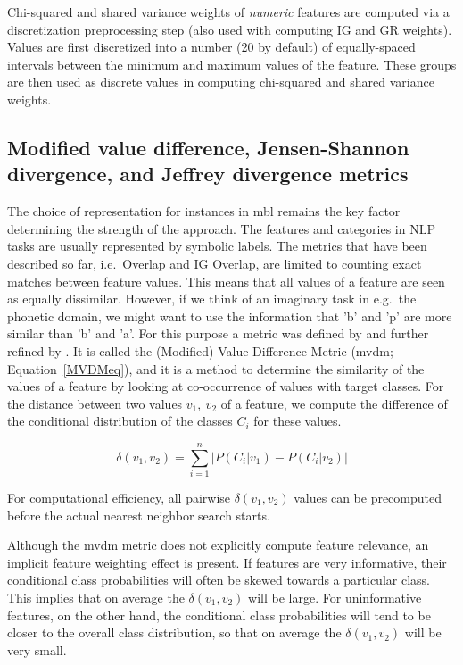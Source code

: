 \documentclass{book}
\begin{document}
Chi-squared and shared variance weights of {\em numeric}\/ features are
computed via a discretization preprocessing step (also used with
computing IG and GR weights). Values are first discretized into a
number (20 by default) of equally-spaced intervals between the
minimum and maximum values of the feature. These groups are then used
as discrete values in computing chi-squared and shared variance weights.

\subsection{Modified value difference, Jensen-Shannon divergence, and Jeffrey divergence metrics}
\label{mvdm}

The choice of representation for instances in {\sc mbl} remains the
key factor determining the strength of the approach. The features and
categories in NLP tasks are usually represented by symbolic
labels. The metrics that have been described so far, i.e.~Overlap and
IG Overlap, are limited to counting exact matches between feature
values. This means that all values of a feature are seen as equally
dissimilar. However, if we think of an imaginary task in e.g.~the
phonetic domain, we might want to use the information that 'b' and 'p'
are more similar than 'b' and 'a'. For this purpose a metric was
defined by  and further refined by
. It is called the (Modified) Value Difference
Metric ({\sc mvdm}; Equation~\ref{MVDMeq}), and it is a method to
determine the similarity of the values of a feature by looking at
co-occurrence of values with target classes. For the distance between
two values $v_{1},\ v_{2}$ of a feature, we compute the difference of
the conditional distribution of the classes $C_{i}$ for these values.

\begin{equation}
\delta(v_{1}, v_{2}) = \sum_{i=1}^{n} \left| P(C_{i}|v_{1}) - P(C_{i}|v_{2})
\right|
\label{MVDMeq}
\end{equation}

For computational efficiency, all pairwise $\delta(v_{1}, v_{2})$
values can be precomputed before the actual nearest neighbor search
starts.

Although the {\sc mvdm} metric does not explicitly compute feature
relevance, an implicit feature weighting effect is present. If
features are very informative, their conditional class probabilities
will often be skewed towards a particular class. This implies that on
average the $\delta(v_{1}, v_{2})$ will be large. For uninformative
features, on the other hand, the conditional class probabilities will
tend to be closer to the overall class distribution, so that on
average the $\delta(v_{1}, v_{2})$ will be very small.
\end{document}
